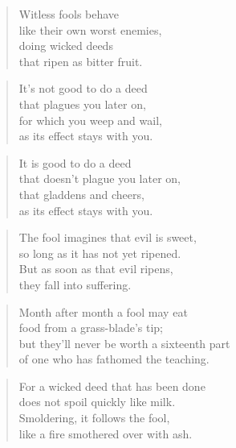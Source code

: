 \documentclass[12pt,openany]{book}%
\begin{document}
\begin{verse}%
Witless fools behave \\
like their own worst enemies, \\
doing wicked deeds \\
that ripen as bitter fruit. 

%
\end{verse}

\begin{verse}%
It’s not good to do a deed \\
that plagues you later on, \\
for which you weep and wail, \\
as its effect stays with you. 

%
\end{verse}

\begin{verse}%
It is good to do a deed \\
that doesn’t plague you later on, \\
that gladdens and cheers, \\
as its effect stays with you. 

%
\end{verse}

\begin{verse}%
The fool imagines that evil is sweet, \\
so long as it has not yet ripened. \\
But as soon as that evil ripens, \\
they fall into suffering. 

%
\end{verse}

\begin{verse}%
Month after month a fool may eat \\
food from a grass-blade’s tip; \\
but they’ll never be worth a sixteenth part \\
of one who has fathomed the teaching. 

%
\end{verse}

\begin{verse}%
For a wicked deed that has been done \\
does not spoil quickly like milk. \\
Smoldering, it follows the fool, \\
like a fire smothered over with ash. 

%
\end{verse}
\end{document}
